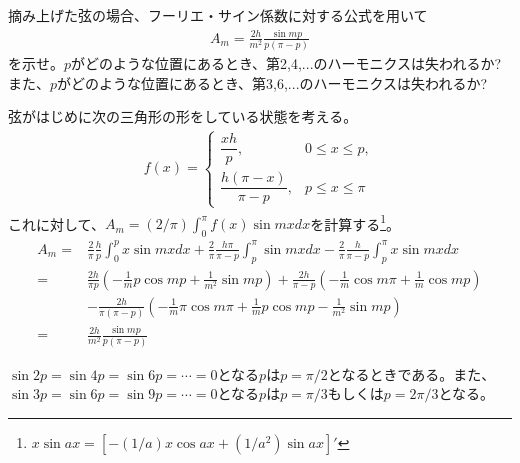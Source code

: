 \begin{renshu}
摘み上げた弦の場合、フーリエ・サイン係数に対する公式を用いて
\begin{align}
A_m=\frac{2h}{m^{2}}\frac{\sin mp}{p(\pi - p)}
\end{align}
を示せ。$p$がどのような位置にあるとき、第2,4,...のハーモニクスは失われるか?
また、$p$がどのような位置にあるとき、第3,6,...のハーモニクスは失われるか?
\end{renshu}

\begin{kaitou*}
弦がはじめに次の三角形の形をしている状態を考える。
\begin{align*}
f(x)=\left\{
\begin{array}{ll}
\dfrac{xh}{p}, & 0\le x\le p,\\
\dfrac{h(\pi-x)}{\pi-p}, & p\le x\le \pi
\end{array}
\right.
\end{align*}
これに対して、$A_{m}=(2/\pi)\int_{0}^{\pi}f(x)\sin mxdx$を計算する\footnote{$x\sin ax=[-(1/a)x\cos ax+(1/a^{2})\sin ax]'$}。
\begin{align*}
A_{m}=&\frac{2}{\pi}\frac{h}{p}\int_{0}^{p}x\sin mxdx+\frac{2}{\pi}\frac{h\pi}{\pi-p}\int_{p}^{\pi}\sin mxdx-\frac{2}{\pi}\frac{h}{\pi-p}\int_{p}^{\pi}x\sin mxdx\\
=&\frac{2h}{\pi p}\left(-\frac{1}{m}p\cos mp+\frac{1}{m^2}\sin mp\right)
+\frac{2h}{\pi-p}\left(-\frac{1}{m}\cos m\pi+\frac{1}{m}\cos mp\right)\\
&-\frac{2h}{\pi(\pi-p)}\left(-\frac{1}{m}\pi\cos m\pi+\frac{1}{m}p\cos mp-\frac{1}{m^2}\sin mp\right)\\
=&\frac{2h}{m^{2}}\frac{\sin mp}{p(\pi - p)}
\end{align*}

$\sin 2p=\sin 4p=\sin6p=\cdots=0$となる$p$は$p=\pi/2$となるときである。また、$\sin 3p=\sin 6p=\sin 9p=\cdots=0$となる$p$は$p=\pi/3$もしくは$p=2\pi/3$となる。

\end{kaitou*}